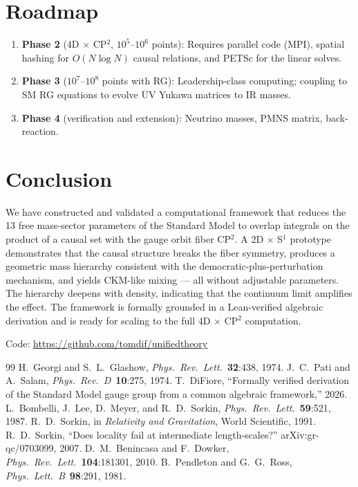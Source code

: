 \documentclass[12pt,a4paper]{article}
\begin{document}
\section{Roadmap}

\begin{enumerate}
\item \textbf{Phase 2} (4D $\times$ CP$^2$, $10^5$--$10^6$ points):
  Requires parallel code (MPI), spatial hashing for $O(N \log N)$
  causal relations, and PETSc for the linear solves.

\item \textbf{Phase 3} ($10^7$--$10^8$ points with RG):
  Leadership-class computing; coupling to SM RG equations to evolve
  UV Yukawa matrices to IR masses.

\item \textbf{Phase 4} (verification and extension):
  Neutrino masses, PMNS matrix, back-reaction.
\end{enumerate}

\section{Conclusion}

We have constructed and validated a computational framework that
reduces the 13 free mass-sector parameters of the Standard Model to
overlap integrals on the product of a causal set with the gauge orbit
fiber CP$^2$.  A 2D $\times$ S$^1$ prototype demonstrates that the
causal structure breaks the fiber symmetry, produces a geometric mass
hierarchy consistent with the democratic-plus-perturbation mechanism,
and yields CKM-like mixing --- all without adjustable parameters.  The
hierarchy deepens with density, indicating that the continuum limit
amplifies the effect.  The framework is formally grounded in a
Lean-verified algebraic derivation and is ready for scaling to the
full 4D $\times$ CP$^2$ computation.

\medskip

\noindent Code: \url{https://github.com/tomdif/unifiedtheory}

\begin{thebibliography}{99}
 H.~Georgi and S.~L.~Glashow, \emph{Phys.\ Rev.\ Lett.}\ \textbf{32}:438, 1974.
 J.~C.~Pati and A.~Salam, \emph{Phys.\ Rev.\ D}\ \textbf{10}:275, 1974.
 T.~DiFiore, ``Formally verified derivation of the Standard Model gauge group from a common algebraic framework,'' 2026.
 L.~Bombelli, J.~Lee, D.~Meyer, and R.~D.~Sorkin, \emph{Phys.\ Rev.\ Lett.}\ \textbf{59}:521, 1987.
 R.~D.~Sorkin, in \emph{Relativity and Gravitation}, World Scientific, 1991.
 R.~D.~Sorkin, ``Does locality fail at intermediate length-scales?'' arXiv:gr-qc/0703099, 2007.
 D.~M.~Benincasa and F.~Dowker, \emph{Phys.\ Rev.\ Lett.}\ \textbf{104}:181301, 2010.
 B.~Pendleton and G.~G.~Ross, \emph{Phys.\ Lett.\ B}\ \textbf{98}:291, 1981.
\end{thebibliography}
\end{document}
